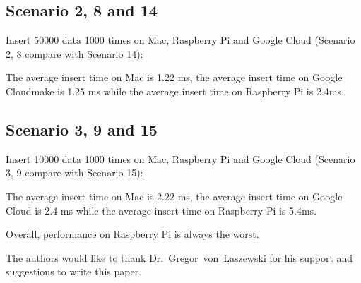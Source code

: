 \subsection{Scenario 2, 8  and 14}
Insert 50000 data 1000 times on Mac, Raspberry Pi and Google Cloud
(Scenario 2, 8 compare with Scenario 14):

The average insert time on Mac is 1.22 ms, the average insert time on 
Google Cloudmake
 is 1.25 ms while the average insert time on  Raspberry Pi is 2.4ms.


\subsection{Scenario 3, 9 and 15}
Insert 10000 data 1000 times on Mac, Raspberry Pi and Google Cloud
(Scenario 3, 9 compare with Scenario 15):

The average insert time on Mac is 2.22 ms, the average insert time on 
Google Cloud
 is 2.4 ms while the average insert time on  Raspberry Pi is 5.4ms.
 
Overall,  performance on Raspberry Pi is  always the worst.


\begin{acks}

  The authors would like to thank Dr.~Gregor~von~Laszewski for his
  support and suggestions to write this paper.

\end{acks}


 

